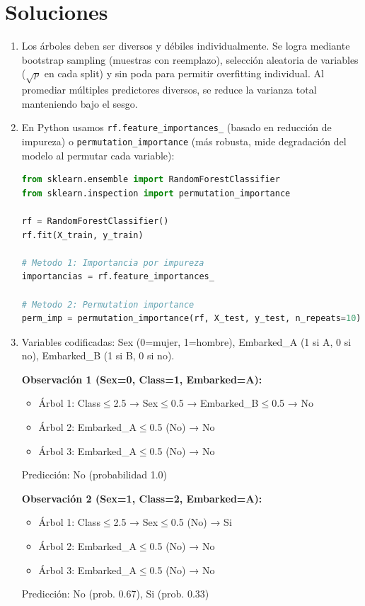\documentclass[12pt]{article}
\begin{document}
\newpage
\section*{Soluciones}

\begin{enumerate}
    \item Los árboles deben ser diversos y débiles individualmente. Se logra mediante bootstrap sampling (muestras con reemplazo), selección aleatoria de variables ($\sqrt{p}$ en cada split) y sin poda para permitir overfitting individual. Al promediar múltiples predictores diversos, se reduce la varianza total manteniendo bajo el sesgo.

    \item En Python usamos \texttt{rf.feature\_importances\_} (basado en reducción de impureza) o \texttt{permutation\_importance} (más robusta, mide degradación del modelo al permutar cada variable):
    
    \begin{lstlisting}[language=Python]
from sklearn.ensemble import RandomForestClassifier
from sklearn.inspection import permutation_importance

rf = RandomForestClassifier()
rf.fit(X_train, y_train)

# Metodo 1: Importancia por impureza
importancias = rf.feature_importances_

# Metodo 2: Permutation importance
perm_imp = permutation_importance(rf, X_test, y_test, n_repeats=10)
    \end{lstlisting}

    \item Variables codificadas: Sex (0=mujer, 1=hombre), Embarked\_A (1 si A, 0 si no), Embarked\_B (1 si B, 0 si no).
    
    \textbf{Observación 1 (Sex=0, Class=1, Embarked=A):}
    \begin{itemize}
        \item Árbol 1: Class$\leq$2.5 → Sex$\leq$0.5 → Embarked\_B$\leq$0.5 → No
        \item Árbol 2: Embarked\_A$\leq$0.5 (No) → No  
        \item Árbol 3: Embarked\_A$\leq$0.5 (No) → No
    \end{itemize}
    Predicción: No (probabilidad 1.0)
    
    \textbf{Observación 2 (Sex=1, Class=2, Embarked=A):}
    \begin{itemize}
        \item Árbol 1: Class$\leq$2.5 → Sex$\leq$0.5 (No) → Si
        \item Árbol 2: Embarked\_A$\leq$0.5 (No) → No
        \item Árbol 3: Embarked\_A$\leq$0.5 (No) → No
    \end{itemize}
    Predicción: No (prob. 0.67), Si (prob. 0.33)


\end{enumerate}
\end{document}
